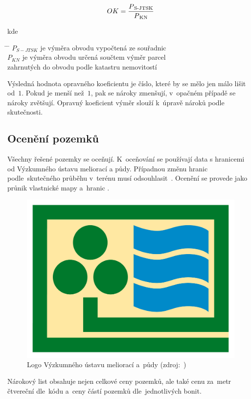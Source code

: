 \begin{equation}
	OK = \frac{P\textsubscript{S-JTSK}}{P\textsubscript{KN}}
\end{equation}

kde
\begin{tabbing}
\hspace{2em} \= \hspace{5em} \= \kill
	\> $P_{S-JTSK}$	\> je výměra obvodu vypočtená ze souřadnic \\
	\> $P_{KN}$	\> je výměra obvodu určená součtem výměr parcel \\
	\> 				\> zahrnutých do obvodu podle katastru nemovitostí
\end{tabbing}

Výsledná hodnota opravného koeficientu je číslo, které by se mělo jen málo lišit od~$1$. Pokud je  menší než~$1$, pak se nároky zmenšují, v~opačném případě se nároky zvětšují. Opravný koeficient výměr slouží k~úpravě nároků podle skutečnosti.

\subsection{Ocenění pozemků}
\label{oceneni}

Všechny řešené pozemky se oceňují. K~oceňování se používají data s hranicemi  od Výzkumného ústavu meliorací a půdy. Případnou změnu hranic  podle~skutečného průběhu v~terénu musí odsouhlasit~. Ocenění se provede jako průnik vlastnické mapy a~hranic .

	\begin{figure}[H]
		\centering
		\includegraphics[width=.5\textwidth]{./pictures/vumop.png}
		\caption[Logo Výzkumného ústavu meliorací a~půdy]{Logo Výzkumného ústavu meliorací a~půdy (zdroj:~\citep{vumop})}
		\label{fig:vumop}
 	\end{figure}

Nárokový list obsahuje nejen celkové ceny pozemků, ale také cenu za~metr čtvereční dle~kódu  a~ceny částí pozemků dle~jednotlivých bonit.


